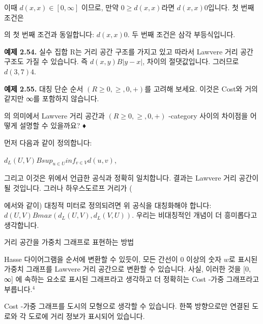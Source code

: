\documentclass[11pt, a4paper, twoside, openany]{book}
\begin{document}
{\par\medskip
이때 $d(x, x) ∈ [0, ∞]$ 이므로, 만약 $0 ≥ d(x, x)$라면 $d(x, x)  0$입니다. 첫 번째 조건은 
\begin{definitionbox}[정의 2.51]
의 첫 번째 조건과 동일합니다: $d(x, x)  0$. 두 번째 조건은 삼각 부등식입니다.
\end{definitionbox}

\par\medskip
\textbf{예제 2.54.} 실수 집합 R\hspace{0pt}는 거리 공간 구조를 가지고 있고 따라서 Lawvere 거리 공간 구조도 가질 수 있습니다. 즉 $d(x, y) B |y − x|$, 차이의 절댓값입니다. 그러므로 $d(3, 7)  4$.

\par\medskip
\textbf{예제 2.55.}
대칭 단순 순서 $(R ≥ 0, ≥, 0, +)$를 고려해 보세요. 이것은 Cost\hspace{0pt}와 거의 같지만 ∞를 포함하지 않습니다. 
\begin{definitionbox}[정의 2.46]
의 의미에서 Lawvere 거리 공간과 $(R ≥ 0, ≥, 0, +)$ -category 사이의 차이점을 어떻게 설명할 수 있을까요?
♦
\end{definitionbox}

\par\medskip
먼저 다음과 같이 정의합니다:

\par\medskip
$d_L(U, V) B sup_{u ∈ U} inf_{v ∈ V} d(u, v)$,

\par\medskip
그리고 이것은 위에서 언급한 공식과 정확히 일치합니다. 결과는 Lawvere 거리 공간이 될 것입니다. 그러나 하우스도르프 거리가 (
\begin{definitionbox}[정의 2.51]
에서와 같이) 대칭적 미터로 정의되려면 위 공식을 대칭화해야 합니다: $d(U, V) B max(d_L(U, V), d_L(V, U))$. 우리는 비대칭적인 개념이 더 흥미롭다고 생각합니다.
\end{definitionbox}

\par\medskip
거리 공간을 가중치 그래프로 표현하는 방법

\par\medskip
Hasse 다이어그램을 순서에 변환할 수 있듯이, 모든 간선이 0 이상의 숫자 $w$로 표시된 가중치 그래프를 Lawvere 거리 공간으로 변환할 수 있습니다. 사실, 이러한 것을 [0, ∞] 에 속하는 요소로 표시된 그래프라고 생각하고 더 정확히는 Cost -가중 그래프라고 부릅니다.$^4$

\par\medskip
Cost -가중 그래프를 도시의 모형으로 생각할 수 있습니다. 한쪽 방향으로만 연결된 도로와 각 도로에 거리 정보가 표시되어 있습니다.

}
\end{document}
